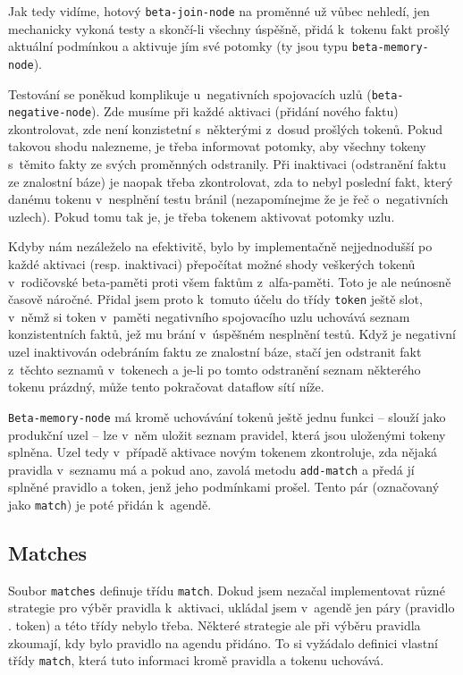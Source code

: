 Jak tedy vidíme, hotový \verb|beta-join-node| na proměnné už vůbec nehledí,
jen mechanicky vykoná testy a skončí-li všechny úspěšně, přidá k~tokenu
fakt prošlý aktuální podmínkou a aktivuje jím své potomky (ty jsou typu
\verb|beta-memory-node|).

Testování se poněkud komplikuje u~negativních spojovacích uzlů
(\verb|beta-negative-node|). Zde musíme při každé aktivaci (přidání nového
faktu) zkontrolovat, zde není konzistetní s~některými z~dosud prošlých tokenů.
Pokud takovou shodu nalezneme, je třeba informovat potomky, aby všechny
tokeny s~těmito fakty ze svých proměnných odstranily. Při inaktivaci
(odstranění faktu ze znalostní báze) je naopak třeba zkontrolovat, zda to
nebyl poslední fakt, který danému tokenu v~nesplnění testu bránil (nezapomínejme
že je řeč o~negativních uzlech). Pokud tomu tak je, je třeba tokenem aktivovat
potomky uzlu.

Kdyby nám nezáleželo na efektivitě, bylo by implementačně nejjednodušší po
každé aktivaci (resp. inaktivaci) přepočítat možné shody veškerých tokenů
v~rodičovské beta-paměti proti všem faktům z~alfa-paměti. Toto je ale
neúnosně časově náročné. Přidal jsem proto k~tomuto účelu do třídy \verb|token|
ještě slot, v~němž si token v~paměti negativního spojovacího uzlu uchovává
seznam konzistentních faktů, jež mu brání v~úspěšném nesplnění testů. Když
je negativní uzel inaktivován odebráním faktu ze znalostní báze, stačí
jen odstranit fakt z~těchto seznamů v~tokenech a je-li po tomto odstranění
seznam některého tokenu prázdný, může tento pokračovat dataflow sítí níže.

\verb|Beta-memory-node| má kromě uchovávání tokenů ještě jednu funkci --
slouží jako produkční uzel -- lze v~něm uložit seznam pravidel, která jsou
uloženými tokeny splněna. Uzel tedy v~případě aktivace novým tokenem
zkontroluje, zda nějaká pravidla v~seznamu má a pokud ano, zavolá metodu
\verb|add-match| a předá jí splněné pravidlo a token, jenž jeho podmínkami
prošel. Tento pár (označovaný jako \verb|match|) je poté přidán k~agendě.
\subsection{Matches}
Soubor \verb|matches| definuje třídu \verb|match|. Dokud jsem nezačal
implementovat různé strategie pro výběr pravidla k~aktivaci, ukládal jsem
v~agendě jen páry (pravidlo . token) a této třídy nebylo třeba. Některé strategie ale
při výběru pravidla zkoumají, kdy bylo pravidlo na agendu přidáno. To si
vyžádalo definici vlastní třídy \verb|match|, která tuto informaci kromě
pravidla a tokenu uchovává.
